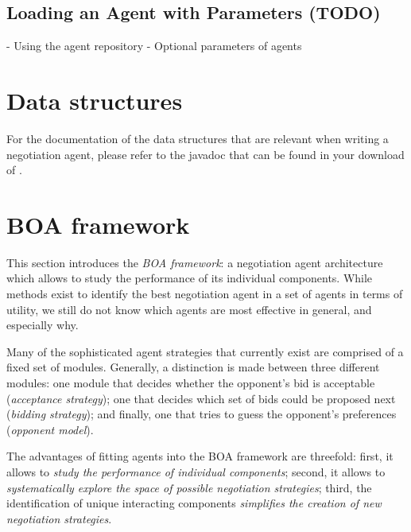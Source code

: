 \documentclass[]{article}
\begin{document}
\subsection{Loading an Agent with Parameters (TODO)}
- Using the agent repository
- Optional parameters of agents
 
\section{Data structures}
For the documentation of the data structures that are relevant when writing a negotiation agent, please refer to the javadoc that can be found in your download of \Genius. 

\section{BOA framework}
This section introduces the \textit{BOA framework}: a negotiation agent architecture which allows to study the performance of its individual components. While methods exist to identify the best negotiation agent in a set of agents in terms of utility, we still do not know which agents are most effective in general, and especially why.%

Many of the sophisticated agent strategies that currently exist are comprised of a fixed set of modules. Generally, a distinction is made between three different modules: one module that decides whether the opponent's bid is acceptable (\textit{acceptance strategy}); one that decides which set of bids could be proposed next (\textit{bidding strategy}); and finally, one that tries to guess the opponent's preferences (\textit{opponent model}).%

The advantages of fitting agents into the BOA framework are threefold: first, it allows to \textit{study the performance of individual components}; second, it allows to \textit{systematically explore the space of possible negotiation strategies}; third, the identification of unique interacting components \textit{simplifies the creation of new negotiation strategies}.
\end{document}
